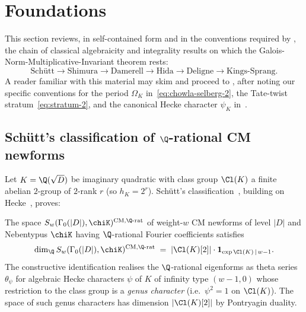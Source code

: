 \section{Foundations}\label{sec:foundations}

This section reviews, in self-contained form and in the conventions
required by , the chain of classical algebraicity and
integrality results on which the
Galois-Norm-Multiplicative-Invariant theorem rests:
\[
\text{Sch\"utt} \longrightarrow \text{Shimura} \longrightarrow
\text{Damerell} \longrightarrow \text{Hida} \longrightarrow
\text{Deligne} \longrightarrow \text{Kings-Sprang}.
\]
A reader familiar with this material may skim and proceed to
, after noting our specific conventions for
the period $\Omega_K$ in~\eqref{eq:chowla-selberg-2}, the
Tate-twist stratum~\eqref{eq:stratum-2}, and the canonical Hecke
character $\psi_K$ in~.

\subsection{Sch\"utt's classification of $\Q$-rational CM newforms}
\label{ss:schutt}

Let $K = \Q(\sqrt{D})$ be imaginary quadratic with class group
$\Cl(K)$ a finite abelian $2$-group of $2$-rank $r$ (so $h_K =
2^r$). Sch\"utt's
classification~\cite{Schutt2008}, building on
Hecke~\cite{Hecke1937}, proves:

\begin{theorem}\label{thm:schutt}
The space $S_w(\Gamma_0(|D|), \chiK)^{\mathrm{CM},\Q\text{-rat}}$
of weight-$w$ CM newforms of level $|D|$ and Nebentypus $\chiK$
having $\Q$-rational Fourier coefficients satisfies
\begin{equation}\label{eq:schutt-dim-2}
\dim_\Q S_w(\Gamma_0(|D|), \chiK)^{\mathrm{CM},\Q\text{-rat}}
\;=\; |\Cl(K)[2]| \cdot \mathbf{1}_{\exp \Cl(K)\,\mid\, w-1}.
\end{equation}
The constructive identification realises the $\Q$-rational
eigenforms as theta series $\theta_\psi$ for algebraic Hecke
characters $\psi$ of $K$ of infinity type $(w-1, 0)$ whose
restriction to the class group is a \emph{genus character} (i.e.\
$\psi^2 = 1$ on $\Cl(K)$). The space of such genus characters has
dimension $|\Cl(K)[2]|$ by Pontryagin duality.
\end{theorem}


